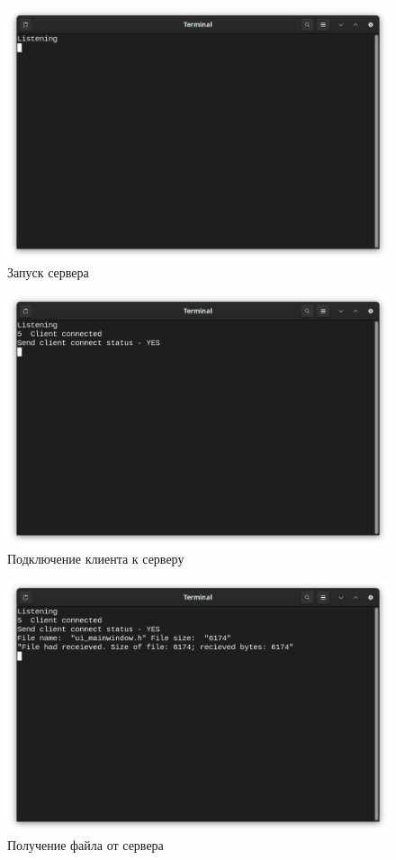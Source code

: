 \documentclass[../AISTR.tex]{subfiles}
\begin{document}
\begin{figure}[p]
	\centering
	\includegraphics[width=\linewidth]{../images/server_start}
	\caption{Запуск сервера}
	\label{fig:serverstart}
\end{figure}


\begin{figure}[p]
	\centering
	\includegraphics[width=\linewidth]{../images/server_connected}
	\caption{Подключение клиента к серверу}
	\label{fig:serverconnected}
\end{figure}

\begin{figure}[p]
	\centering
	\includegraphics[width=\linewidth]{../images/server_received}
	\caption{Получение файла от сервера}
	\label{fig:serverreceived}
\end{figure}
\end{document}
